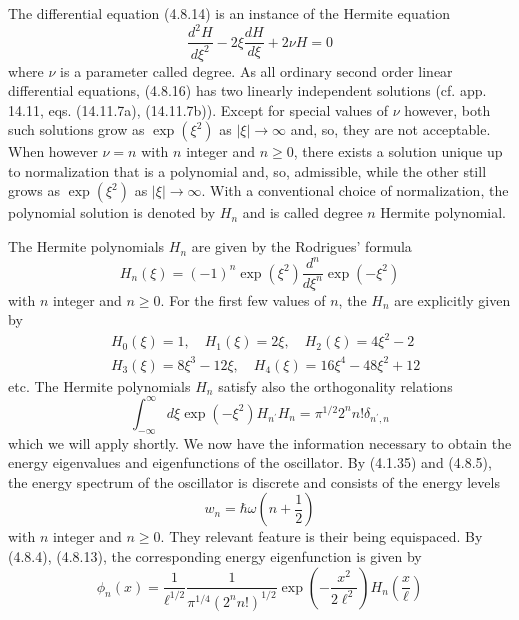 \documentclass{article}
\begin{document}
The differential equation (4.8.14) is an instance of the Hermite equation
$$
\begin{equation*}
\frac{d^{2} H}{d \xi^{2}}-2 \xi \frac{d H}{d \xi}+2 \nu H=0 \tag{4.8.16}
\end{equation*}
$$
where $\nu$ is a parameter called degree. As all ordinary second order linear differential equations, (4.8.16) has two linearly independent solutions (cf. app. 14.11, eqs. (14.11.7a), (14.11.7b)). Except for special values of $\nu$ however, both such solutions grow as $\exp \left(\xi^{2}\right)$ as $|\xi| \rightarrow \infty$ and, so, they are not acceptable. When however $\nu=n$ with $n$ integer and $n \geq 0$, there exists a solution unique up to normalization that is a polynomial and, so, admissible, while the other still grows as $\exp \left(\xi^{2}\right)$ as $|\xi| \rightarrow \infty$. With a conventional choice of normalization, the polynomial solution is denoted by $H_{n}$ and is called degree $n$ Hermite polynomial.

The Hermite polynomials $H_{n}$ are given by the Rodrigues' formula
$$
\begin{equation*}
H_{n}(\xi)=(-1)^{n} \exp \left(\xi^{2}\right) \frac{d^{n}}{d \xi^{n}} \exp \left(-\xi^{2}\right) \tag{4.8.17}
\end{equation*}
$$
with $n$ integer and $n \geq 0$. For the first few values of $n$, the $H_{n}$ are explicitly given by
$$
\begin{align*}
& H_{0}(\xi)=1, \quad H_{1}(\xi)=2 \xi, \quad H_{2}(\xi)=4 \xi^{2}-2  \tag{4.8.18}\\
& H_{3}(\xi)=8 \xi^{3}-12 \xi, \quad H_{4}(\xi)=16 \xi^{4}-48 \xi^{2}+12
\end{align*}
$$
etc. The Hermite polynomials $H_{n}$ satisfy also the orthogonality relations
$$
\begin{equation*}
\int_{-\infty}^{\infty} d \xi \exp \left(-\xi^{2}\right) H_{n^{\prime}} H_{n}=\pi^{1 / 2} 2^{n} n!\delta_{n^{\prime}, n} \tag{4.8.19}
\end{equation*}
$$
which we will apply shortly.
We now have the information necessary to obtain the energy eigenvalues and eigenfunctions of the oscillator. By (4.1.35) and (4.8.5), the energy spectrum of the oscillator is discrete and consists of the energy levels
$$
\begin{equation*}
w_{n}=\hbar \omega\left(n+\frac{1}{2}\right) \tag{4.8.20}
\end{equation*}
$$
with $n$ integer and $n \geq 0$. They relevant feature is their being equispaced. By
(4.8.4), (4.8.13), the corresponding energy eigenfunction is given by
$$
\begin{equation*}
\phi_{n}(x)=\frac{1}{\ell^{1 / 2}} \frac{1}{\pi^{1 / 4}\left(2^{n} n!\right)^{1 / 2}} \exp \left(-\frac{x^{2}}{2 \ell^{2}}\right) H_{n}\left(\frac{x}{\ell}\right) \tag{4.8.21}
\end{equation*}
$$
\end{document}
